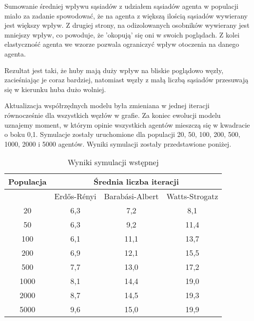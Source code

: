 Sumowanie średniej wpływu sąsiadów z udziałem sąsiadów agenta w populacji miało za zadanie spowodować, że na agenta z większą ilością sąsiadów wywierany jest większy wpływ.
Z drugiej strony, na odizolowanych osobników wywierany jest mniejszy wpływ, co powoduje, że 'okopują' się oni w swoich poglądach.
Z kolei elastyczność agenta we wzorze pozwala ograniczyć wpływ otoczenia na danego agenta.

Rezultat jest taki, że huby mają duży wpływ na bliskie poglądowo węzły, zacieśniając je coraz bardziej, natomiast węzły z małą liczbą sąsiadów przesuwają się w kierunku huba dużo wolniej.

Aktualizacja współrzędnych modelu była zmieniana w jednej iteracji równocześnie dla wszystkich węzłów w grafie.
Za koniec ewolucji modelu uznajemy moment, w którym opinie wszystkich agentów mieszczą się w kwadracie o boku 0,1.
Symulacje zostały uruchomione dla populacji 20, 50, 100, 200, 500, 1000, 2000 i 5000 agentów.
Wyniki symulacji zostały przedstawione poniżej.

\begin{table}[htbp]
    \centering
    \begin{tabular}{c|c|c|c}
        \hline
        Populacja & \multicolumn{3}{c}{Średnia liczba iteracji}                                    \\
        \hline
                  & Erdős-Rényi                                 & Barabási-Albert & Watts-Strogatz \\
        \hline
        20        & 6,3                                         & 7,2             & 8,1            \\
        50        & 6,3                                         & 9,2             & 11,4           \\
        100       & 6,1                                         & 11,1            & 13,7           \\
        200       & 6,9                                         & 12,1            & 15,5           \\
        500       & 7,7                                         & 13,0            & 17,2           \\
        1000      & 8,1                                         & 14,4            & 19,0           \\
        2000      & 8,7                                         & 14,5            & 19,3           \\
        5000      & 9,6                                         & 15,0            & 19,9           \\
    \end{tabular}
    \caption{Wyniki symulacji wstępnej}
    \label{tab:initial_results}
\end{table}

